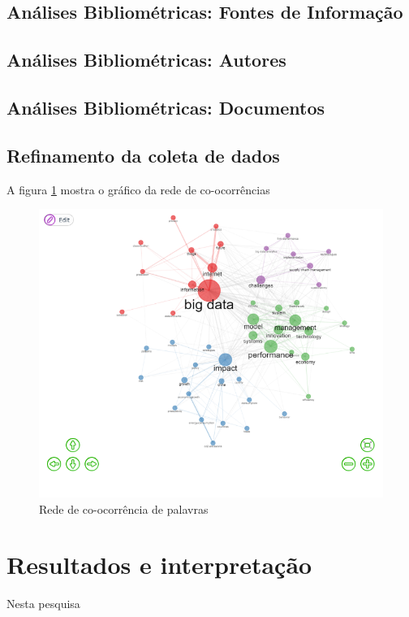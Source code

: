 \subsection{Análises Bibliométricas: Fontes de Informação}

\subsection{Análises Bibliométricas: Autores}

\subsection{Análises Bibliométricas: Documentos}

\subsection{Refinamento da coleta de dados}

A figura \ref{fig:rede} mostra o gráfico da rede de co-ocorrências

\begin{figure}[ht]
    \centering
    \includegraphics[width=12cm]{experiments/Tong00020/PesquisaBibliometrica/Conceptual Structure/MASSA@Tong00020-Co-occurrence Network}
    \caption{Rede de co-ocorrência de palavras}
    \label{fig:rede}
\end{figure}

\section{Resultados e interpretação}
Nesta pesquisa 